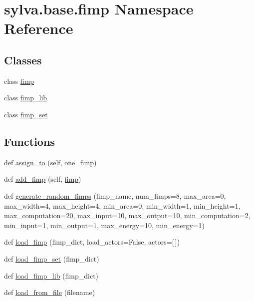 \hypertarget{namespacesylva_1_1base_1_1fimp}{}\section{sylva.\+base.\+fimp Namespace Reference}
\label{namespacesylva_1_1base_1_1fimp}
\subsection*{Classes}
\begin{DoxyCompactItemize}
\item 
class \hyperlink{classsylva_1_1base_1_1fimp_1_1fimp}{fimp}
\item 
class \hyperlink{classsylva_1_1base_1_1fimp_1_1fimp__lib}{fimp\+\_\+lib}
\item 
class \hyperlink{classsylva_1_1base_1_1fimp_1_1fimp__set}{fimp\+\_\+set}
\end{DoxyCompactItemize}
\subsection*{Functions}
\begin{DoxyCompactItemize}
\item 
def \hyperlink{namespacesylva_1_1base_1_1fimp_ad6282a735b53c953ed8ac941c4dbf17a}{assign\+\_\+to} (self, one\+\_\+fimp)
\item 
def \hyperlink{namespacesylva_1_1base_1_1fimp_a33d5ea52e7780ea1d4f0df718eab4ff2}{add\+\_\+fimp} (self, \hyperlink{classsylva_1_1base_1_1fimp_1_1fimp}{fimp})
\item 
def \hyperlink{namespacesylva_1_1base_1_1fimp_a437b2db1db9bdd48145289d66871b835}{generate\+\_\+random\+\_\+fimps} (fimp\+\_\+name, num\+\_\+fimps=8, max\+\_\+area=0, max\+\_\+width=4, max\+\_\+height=4, min\+\_\+area=0, min\+\_\+width=1, min\+\_\+height=1, max\+\_\+computation=20, max\+\_\+input=10, max\+\_\+output=10, min\+\_\+computation=2, min\+\_\+input=1, min\+\_\+output=1, max\+\_\+energy=10, min\+\_\+energy=1)
\item 
def \hyperlink{namespacesylva_1_1base_1_1fimp_a49222336c8f368ae3381e7b8b456a8b4}{load\+\_\+fimp} (fimp\+\_\+dict, load\+\_\+actors=False, actors=\mbox{[}$\,$\mbox{]})
\item 
def \hyperlink{namespacesylva_1_1base_1_1fimp_ad713bc31de8ee05df0c1184daba1ffb8}{load\+\_\+fimp\+\_\+set} (fimp\+\_\+dict)
\item 
def \hyperlink{namespacesylva_1_1base_1_1fimp_a57a8b55e554c3c8977bdca59b12fde4f}{load\+\_\+fimp\+\_\+lib} (fimp\+\_\+dict)
\item 
def \hyperlink{namespacesylva_1_1base_1_1fimp_ae9ea3885312a946a5a94bd8b2eef9b95}{load\+\_\+from\+\_\+file} (filename)
\end{DoxyCompactItemize}
